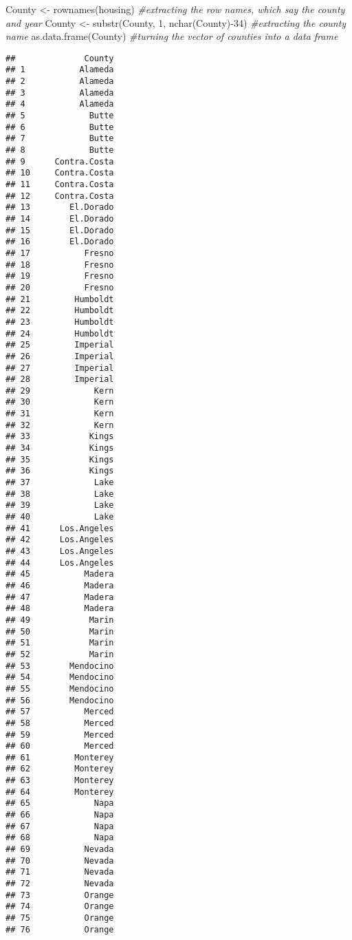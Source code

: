 \documentclass[
]{article}
\newenvironment{Shaded}{\begin{snugshade}}{\end{snugshade}}
\newcommand{\CommentTok}[1]{\textcolor[rgb]{0.56,0.35,0.01}{\textit{#1}}}
\newcommand{\DecValTok}[1]{\textcolor[rgb]{0.00,0.00,0.81}{#1}}
\newcommand{\FunctionTok}[1]{\textcolor[rgb]{0.00,0.00,0.00}{#1}}
\newcommand{\NormalTok}[1]{#1}
\newcommand{\OtherTok}[1]{\textcolor[rgb]{0.56,0.35,0.01}{#1}}
\newcommand{\SpecialCharTok}[1]{\textcolor[rgb]{0.00,0.00,0.00}{#1}}
\begin{document}
\begin{Shaded}
\begin{Highlighting}[]
\NormalTok{County }\OtherTok{\textless{}{-}} \FunctionTok{rownames}\NormalTok{(housing) }\CommentTok{\#extracting the row names, which say the county and year}
\NormalTok{County }\OtherTok{\textless{}{-}} \FunctionTok{substr}\NormalTok{(County, }\DecValTok{1}\NormalTok{, }\FunctionTok{nchar}\NormalTok{(County)}\SpecialCharTok{{-}}\DecValTok{34}\NormalTok{) }\CommentTok{\#extracting the county name}
\FunctionTok{as.data.frame}\NormalTok{(County) }\CommentTok{\#turning the vector of counties into a data frame}
\end{Highlighting}
\end{Shaded}

\begin{verbatim}
##              County
## 1           Alameda
## 2           Alameda
## 3           Alameda
## 4           Alameda
## 5             Butte
## 6             Butte
## 7             Butte
## 8             Butte
## 9      Contra.Costa
## 10     Contra.Costa
## 11     Contra.Costa
## 12     Contra.Costa
## 13        El.Dorado
## 14        El.Dorado
## 15        El.Dorado
## 16        El.Dorado
## 17           Fresno
## 18           Fresno
## 19           Fresno
## 20           Fresno
## 21         Humboldt
## 22         Humboldt
## 23         Humboldt
## 24         Humboldt
## 25         Imperial
## 26         Imperial
## 27         Imperial
## 28         Imperial
## 29             Kern
## 30             Kern
## 31             Kern
## 32             Kern
## 33            Kings
## 34            Kings
## 35            Kings
## 36            Kings
## 37             Lake
## 38             Lake
## 39             Lake
## 40             Lake
## 41      Los.Angeles
## 42      Los.Angeles
## 43      Los.Angeles
## 44      Los.Angeles
## 45           Madera
## 46           Madera
## 47           Madera
## 48           Madera
## 49            Marin
## 50            Marin
## 51            Marin
## 52            Marin
## 53        Mendocino
## 54        Mendocino
## 55        Mendocino
## 56        Mendocino
## 57           Merced
## 58           Merced
## 59           Merced
## 60           Merced
## 61         Monterey
## 62         Monterey
## 63         Monterey
## 64         Monterey
## 65             Napa
## 66             Napa
## 67             Napa
## 68             Napa
## 69           Nevada
## 70           Nevada
## 71           Nevada
## 72           Nevada
## 73           Orange
## 74           Orange
## 75           Orange
## 76           Orange

\end{verbatim}
\end{document}
